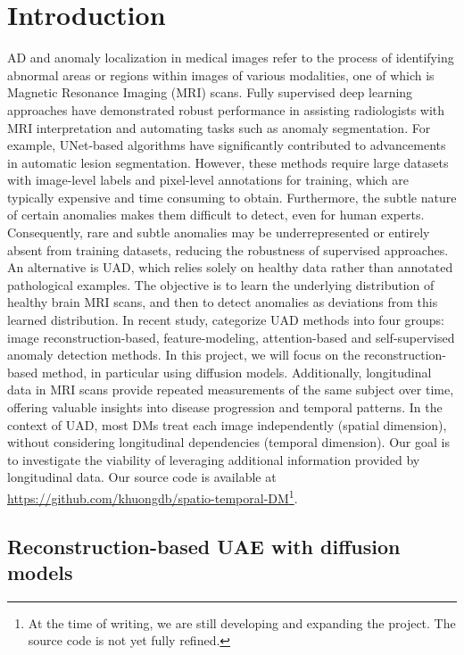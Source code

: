 \chapter{Introduction}
\label{chap:introduction}
\minitoc

\ac{AD} and anomaly localization in medical images refer to the process of identifying abnormal areas or regions within images of various modalities, one of which is Magnetic Resonance Imaging (MRI) scans. Fully supervised deep learning approaches have demonstrated robust performance in assisting radiologists with MRI interpretation and automating tasks such as anomaly segmentation. For example, UNet-based algorithms have significantly contributed to advancements in automatic lesion segmentation. However, these methods require large datasets with image-level labels and pixel-level annotations for training, which are typically expensive and time consuming to obtain. Furthermore, the subtle nature of certain anomalies makes them difficult to detect, even for human experts. Consequently, rare and subtle anomalies may be underrepresented or entirely absent from training datasets, reducing the robustness of supervised approaches. An alternative is \ac{UAD}, which relies solely on healthy data rather than annotated pathological examples. The objective is to learn the underlying distribution of healthy brain MRI scans, and then to detect anomalies as deviations from this learned distribution. In recent study, \cite{lagogiannisUADStudyOfSOTA} categorize UAD methods into four groups: image reconstruction-based, feature-modeling, attention-based and self-supervised anomaly detection methods. In this project, we will focus on the reconstruction-based method, in particular using diffusion models. Additionally, longitudinal data in MRI scans provide repeated measurements of the same subject over time, offering valuable insights into disease progression and temporal patterns. In the context of \ac{UAD}, most \ac{DMs} treat each image independently (spatial dimension), without considering longitudinal dependencies (temporal dimension). Our goal is to investigate the viability of leveraging additional information provided by longitudinal data. Our source code is available at \url{https://github.com/khuongdb/spatio-temporal-DM}\footnote{At the time of writing, we are still developing and expanding the project. The source code is not yet fully refined.}.  

\section{Reconstruction-based UAE with diffusion models}
\label{sec:introduction-sdm}

